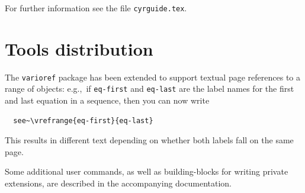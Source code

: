 \documentclass{ltnews}
\providecommand\pkg[1]{\texttt{#1}}
\providecommand\file[1]{\texttt{#1}}
\begin{document}
For further information see the file \file{cyrguide.tex}.

\section{Tools distribution}

The \pkg{varioref} package has been extended to support textual
page references to a range of objects: e.g.,~if \texttt{eq-first}
and \texttt{eq-last} are the label names for the first and last
equation in a sequence, then you can now write
\begin{verbatim}
  see~\vrefrange{eq-first}{eq-last}
\end{verbatim}
This results in different text depending on whether both
labels fall on the same page.

Some additional user commands, as well as building-blocks for writing
private extensions, are described in the accompanying documentation.
\end{document}
